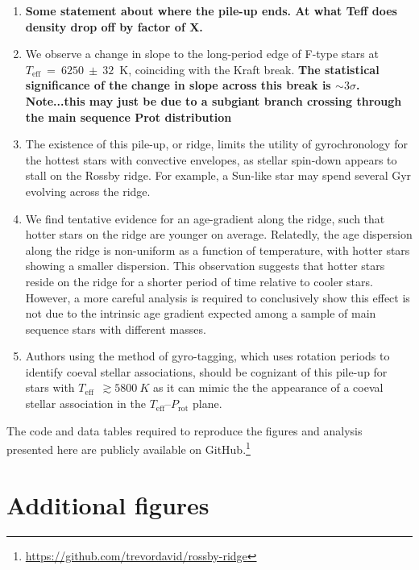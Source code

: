 \documentclass[linenumbers,tighten,trackchanges,twocolumn]{aastex631}
\newcommand{\teff}{\ensuremath{T_{\mathrm{eff}}}\xspace}
\newcommand{\prot}{\ensuremath{P_\mathrm{rot}}\xspace}
\newcommand{\rvar}{\ensuremath{R_\mathrm{var}}\xspace}
\begin{document}
\begin{enumerate}
    \item \textbf{Some statement about where the pile-up ends. At what Teff does density drop off by factor of X.}
    
    \item We observe a change in slope to the long-period edge of F-type stars at $\teff~=~6250~\pm~32$~K, coinciding with the Kraft break. \textbf{The statistical significance of the change in slope across this break is $\sim 3\sigma$. Note...this may just be due to a subgiant branch crossing through the main sequence Prot distribution}
    
    \item The existence of this pile-up, or ridge, limits the utility of gyrochronology for the hottest stars with convective envelopes, as stellar spin-down appears to stall on the Rossby ridge. For example, a Sun-like star may spend several Gyr evolving across the ridge.
    
    \item We find tentative evidence for an age-gradient along the ridge, such that hotter stars on the ridge are younger on average. Relatedly, the age dispersion along the ridge is non-uniform as a function of temperature, with hotter stars showing a smaller dispersion. This observation suggests that hotter stars reside on the ridge for a shorter period of time relative to cooler stars. However, a more careful analysis is required to conclusively show this effect is not due to the intrinsic age gradient expected among a sample of main sequence stars with different masses.
    
    \item Authors using the method of gyro-tagging, which uses rotation periods to identify coeval stellar associations, should be cognizant of this pile-up for stars with \teff~$\gtrsim5800~K$ as it can mimic the the appearance of a coeval stellar association in the \teff--\prot plane.   
    
\end{enumerate}

The code and data tables required to reproduce the figures and analysis presented here are publicly available on GitHub.\footnote{\url{https://github.com/trevordavid/rossby-ridge}}

\newpage 
\appendix 
\section{Additional figures}


\end{document}

